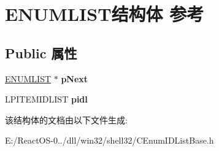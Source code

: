 \hypertarget{struct_e_n_u_m_l_i_s_t}{}\section{E\+N\+U\+M\+L\+I\+S\+T结构体 参考}
\label{struct_e_n_u_m_l_i_s_t}
\subsection*{Public 属性}
\begin{DoxyCompactItemize}
\item 
\mbox{\label{struct_e_n_u_m_l_i_s_t_a4046f0b071c37ac6fbd1c4c2328dd30d}} 
\hyperlink{struct_e_n_u_m_l_i_s_t}{E\+N\+U\+M\+L\+I\+ST} $\ast$ {\bfseries p\+Next}
\item 
\mbox{\label{struct_e_n_u_m_l_i_s_t_a5e1ed820f183fefe018c228883cc930c}} 
L\+P\+I\+T\+E\+M\+I\+D\+L\+I\+ST {\bfseries pidl}
\end{DoxyCompactItemize}


该结构体的文档由以下文件生成\+:\begin{DoxyCompactItemize}
\item 
E\+:/\+React\+O\+S-\/0../dll/win32/shell32/C\+Enum\+I\+D\+List\+Base.\+h\end{DoxyCompactItemize}
